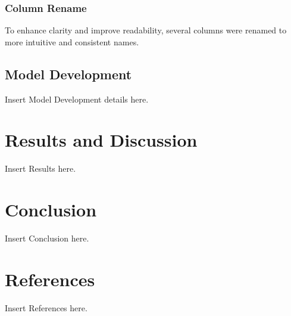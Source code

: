 \documentclass[12pt]{article}
\begin{document}
\subsubsection{Column Rename}
To enhance clarity and improve readability, several columns were renamed to more intuitive and consistent names. 
\vspace{5pt}
\subsubsection{}


\subsubsection{}


\subsubsection{}


\subsubsection{}

\subsection{Model Development}
Insert Model Development details here.

\section{Results and Discussion}
Insert Results here.

\section{Conclusion}
Insert Conclusion here.

\section{References}
Insert References here.
\end{document}
